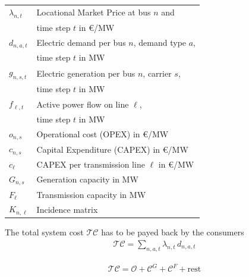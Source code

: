 \documentclass[11pt,twocolumn]{article}
\newcommand{\vpad}{\vspace{1mm}}
\newcommand{\generation}[1][n]{g_{#1,s,t}}
\newcommand{\capacityGeneration}{G_{n,s}}
\newcommand{\capacityFlow}{F_{\ell}}
\newcommand{\capexGeneration}{c_{n,s}}
\newcommand{\capexFlow}{c_{\ell}}
\newcommand{\opexGeneration}[1][n]{o_{#1,s}}
\newcommand{\demand}[1][n]{d_{#1,a,t}}
\newcommand{\incidence}[1][n]{K_{#1,\ell}}
\newcommand{\lmp}[1][n]{\lambda_{#1,t}}
\newcommand{\flow}{f_{\ell,t}}
\newcommand{\totalcost}{\mathcal{TC}}
\newcommand{\totalOpexGeneration}{\mathcal{O}}
\newcommand{\totalCapexGeneration}{\mathcal{C}^G}
\newcommand{\totalCapexFlow}{\mathcal{C}^F}
\begin{document}
\begin{table}[h]
	\centering
	\begin{tabular}{ll}
        $\lmp$ & Locational Market Price at bus $n$ and  \\ & time step $t$ in \euro/MW \vpad \\
        $\demand$ & Electric demand per bus $n$, demand type $a$, \\ & time step $t$ in MW  \vpad \\
        $\generation$ & Electric generation per bus $n$, carrier $s$, \\ & time step $t$  in MW \vpad \\
        $\flow$ & Active power flow on line $\ell$, \\ & time step $t$ in MW   \vpad \\
        $\opexGeneration$ & Operational cost (OPEX) in \euro/MW \vpad \\
        $\capexGeneration$ & Capital Expenditure (CAPEX) in \euro/MW \vpad \\
        $\capexFlow$  & CAPEX per transmission line $\ell$ in \euro/MW  \vpad \\
        $\capacityGeneration$ & Generation capacity in MW \vpad \\
        $\capacityFlow$ & Transmission capacity in MW \vpad \\
        $\incidence$ & Incidence matrix \vpad 
	\end{tabular}
\end{table}



The total system cost $\totalcost$ has to be payed back by the consumers 
\begin{align}
 \totalcost =  \sum_{n,a,t} \lmp \, \demand
\end{align}

\begin{align}
 \totalcost = \totalOpexGeneration + \totalCapexGeneration +  \totalCapexFlow + \text{rest}
\end{align}
\end{document}
